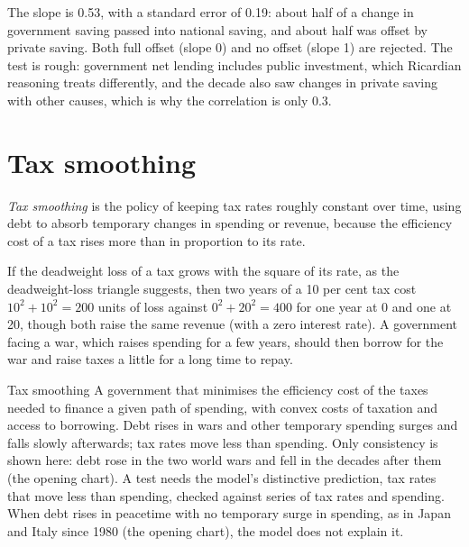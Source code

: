 The slope is 0.53, with a standard error of 0.19: about half of a change in government saving passed into national saving, and
about half was offset by private saving. Both full offset (slope 0) and no offset (slope 1) are rejected. The test is rough: government
net lending includes public investment, which Ricardian reasoning treats differently, and the decade also saw changes in
private saving with other causes, which is why the correlation is only 0.3.

\section{Tax smoothing}\label{sec:b2:government-debt:tax-smoothing}

\begin{definition}\label{def:b2:government-debt:tax-smoothing}
\emph{Tax smoothing} is the policy of keeping tax rates roughly constant over time, using debt to
absorb temporary changes in spending or revenue, because the efficiency cost of a tax rises more than in proportion to
its rate.
\end{definition}

If the deadweight loss of a tax grows with the square of its rate, as the deadweight-loss triangle suggests, then two years of
a 10 per cent tax cost $10^2 + 10^2 = 200$ units of loss against $0^2 + 20^2 = 400$ for one year at 0 and one at 20, though both raise the same revenue (with a zero interest rate). A government
facing a war, which raises spending for a few years, should then borrow for the war and raise taxes a little for a long
time to repay.

\begin{model}{Tax smoothing}
\assumes A government that minimises the efficiency cost of the taxes needed to finance a given path of spending, with
convex costs of taxation and access to borrowing.
\predicts Debt rises in wars and other temporary spending surges and falls slowly afterwards; tax rates move less than
spending.
\tested Only consistency is shown here: debt rose in the two world wars and fell in the decades after them (the opening
chart). A test needs the model's distinctive prediction, tax rates that move less than spending, checked against
series of tax rates and spending.
\breaks When debt rises in peacetime with no temporary surge in spending, as in Japan and Italy since 1980 (the opening
chart), the model does not explain it.
\end{model}

